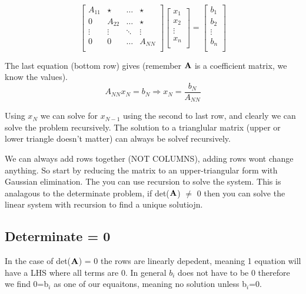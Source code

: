 \documentclass{article}
\newcommand{\be}{\begin{equation}}
\newcommand{\ee}{\end{equation}}
\newcommand{\bA}{\mbox{\bf A}}
\begin{document}
\be
\begin{bmatrix}
    A_{11}  &   \star   & \dots &  \star\\
    0       &   A_{22}       & \dots     &   \star\\
\vdots  &  \vdots   &   \ddots  &   \vdots\\   
    0       &   0       & \dots     &   A_{NN}\\
\end{bmatrix}
\begin{bmatrix}
x_1     \\
x_2     \\
\vdots  \\
x_n     \\
\end{bmatrix}
=
\begin{bmatrix}
b_1     \\
b_2     \\
\vdots  \\
b_n     \\
\end{bmatrix}
\ee

The last equation (bottom row) gives (remember $\bA$ is a coefficient matrix, we know the values).
\be
A_{NN}x_N=b_N \Rightarrow x_N = \frac{b_N}{A_{NN}}
\ee

Using $x_N$ we can solve for $x_{N-1}$ using the second to last row, and clearly we can solve the problem recursively. 
The solution to a trianglular matrix (upper or lower triangle doesn't matter) can always be solvef recursively. 

We can always add rows together (NOT COLUMNS), adding rows wont change anything. 
So start by reducing the matrix to an upper-triangular form with Gaussian elimination. 
The you can use recursion to solve the system.
This is analagous to the determinate problem, if det($\bA$) $\neq$ 0 then you can solve the linear system with recursion to find a unique solutiojn. 

\subsection{Determinate = 0}
In the case of det($\bA$) = 0 the rows are linearly depedent, meaning 1 equation will have a LHS where all terms are 0. 
In general $b_i$ does not have to be 0 therefore we find 0=b$_i$ as one of our equaitons, meaning no solution unless b$_i$=0. 
\end{document}
